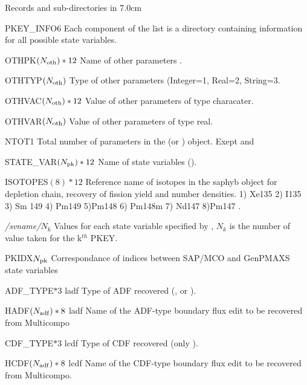 

\begin{DescriptionEnregistrement}{Records and sub-directories
 in  }{7.0cm} \label{tabl:tabsap}
 
\DirlEnr
{PKEY\_INFO}{6}
{Each component of the list is a directory containing information for all possible state variables.}  

\CharEnr
 {OTHPK}{$(N_{\rm oth})*12$}  {Name of other parameters .}

\IntEnr
 {OTHTYP}{$(N_{\rm oth})$} {Type of other parameters (Integer=1, Real=2, String=3.}
 
\CharEnr
 {OTHVAC}{$(N_{\rm oth})*12$} {Value of other parameters of type characater.}

\RealEnr
 {OTHVAR}{$(N_{\rm oth})$} { } {Value of other parameters of type real.}

 \IntEnr
 {NTOT}{1}
 {Total number of parameters in the  (or ) object. Exept  and  }
  
\CharEnr
 {STATE\_VAR}{$(N_{\rm pk})*12$} {Name of state variables ().}

\CharEnr
 {ISOTOPES}{$(8)*12$} {Reference name of isotopes in the saphyb object for depletion chain, recovery of fission yield and number densities. 1) Xe135 2) I135 3) Sm 149 4) Pm149 5)Pm148 6) Pm148m 7) Nd147 8)Pm147 .}
  
\RealEnr
 {\textit{/svname/}}{$N_{k}$}{ }
 {Values for each state variable specified by , $N_{k}$ is the number of value taken for the k$^{th}$ PKEY. }  
 
\IntEnr
 {PKIDX}{$N_{\rm pk}$}
 {Correspondance of indices between SAP/MCO and GenPMAXS state variables}

\OptCharEnr 
 {ADF\_TYPE}{$*3$} {ladf}  {Type of ADF recovered (,  or ).}

\OptCharEnr
 {HADF}{$(N_{\rm adf})*8$} {ladf} {Name of the ADF-type boundary flux edit to be recovered from Multicompo }    

\OptCharEnr
 {CDF\_TYPE}{$*3$} {lcdf} {Type of CDF recovered (only ).}

\OptCharEnr
 {HCDF}{$(N_{\rm adf})*8$} {lcdf} {Name of the CDF-type boundary flux edit to be recovered from Multicompo.}    
 

\end{DescriptionEnregistrement}

